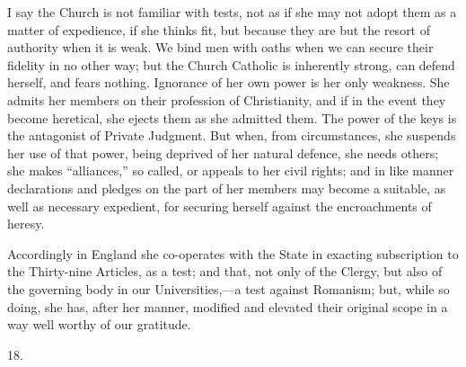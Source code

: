 I say the Church is not familiar with tests, not as if she may not
adopt them as a matter of expedience, if she thinks fit, but because
they are but the resort of authority when it is weak. We bind men with
oaths when we can secure their fidelity in no other way; but the
Church Catholic is inherently strong, can defend herself, and fears
nothing. Ignorance of her own power is her only weakness. She admits
her members on their profession of Christianity, and if in the event
they become heretical, she ejects them as she admitted them. The power
of the keys is the antagonist of Private Judgment. But when, from
circumstances, she suspends her use of that power, being deprived of
her natural defence, she needs others; she makes
``alliances,'' so called, or appeals to her civil rights; and
in like manner declarations and pledges on the part of her members may
become a suitable, as well as necessary expedient, for securing
herself against the encroachments of heresy.

Accordingly in England she co-operates with the State in exacting
subscription to the Thirty-nine Articles, as a test; and that, not
only of the Clergy, but also of the governing body in our
Universities,—a test against Romanism; but, while so doing, she has,
after her manner, modified and elevated their original scope in a way
well worthy of our gratitude.

18.

